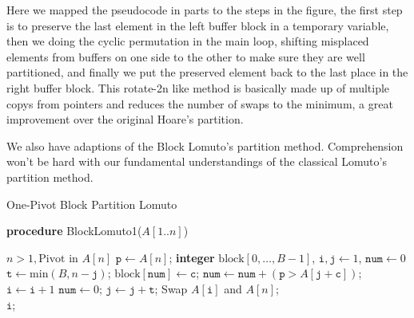 \documentclass{article}
\newcommand\lomutoone{\textsf{BlockLomuto1}}
\begin{document}
Here we mapped the pseudocode in parts to the steps in the figure, the first step is to preserve the last element in the left buffer block in a temporary variable,
then we doing the cyclic permutation in the main loop, shifting misplaced elements from buffers on one side to the other to make sure they are well partitioned, and finally we put the preserved element back to the last place in the right buffer block.
This rotate-2n like method is basically made up of multiple copys from pointers and reduces the number of swaps to the minimum, a great improvement over the original Hoare's partition.

We also have adaptions of the Block Lomuto's partition method. Comprehension won't be hard with our fundamental understandings of the classical Lomuto's partition method.

\begin{algorithm}[t!]
    \small
    \caption{One-Pivot Block Partition Lomuto}\samepage\label{algo:single:pivot:partitioning}
    \textbf{procedure} \lomutoone($\textit{A}[1..\textit{n}]$)
    \begin{algorithmic}[1]
        \Require $\textit{n} > 1, \text{Pivot in $\textit{A}[\textit{n}]$}$
        \State $\texttt{p} \gets \textit{A}[\textit{n}]$; 
    \State \textbf{integer} $\text{block}[0, \ldots, \textit{B} - 1]$, $\texttt{i}, \texttt{j} \gets 1$, $\texttt{num} \gets 0$
    \State $\texttt{t} \gets \text{min}(\textit{B}, \textit{n} - \texttt{j} )$;
                \State $\text{block}[\texttt{num}] \gets \texttt{c}$;
            \State $\texttt{num} \gets \texttt{num} +  (\texttt{p} > \textit{A}[\texttt{j} + \texttt{c}])$;
            \EndFor
        \State {}
        \State $\texttt{i} \gets \texttt{i} + 1$
            \EndFor
            \State $\texttt{num} \gets 0$;
        \State $\texttt{j} \gets \texttt{j} + \texttt{t}$;
        \EndWhile
        \State Swap $\textit{A}[\texttt{i}]$ and $\textit{A}[\textit{n}]$;\\
    \Return $\texttt{i}$;
    \end{algorithmic}
\end{algorithm}
\end{document}
